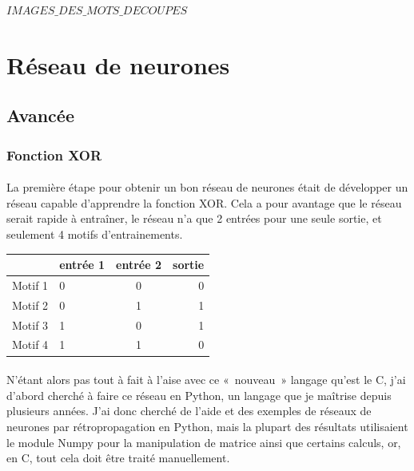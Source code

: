 \documentclass{article}
\begin{document}
	$IMAGES\_DES\_MOTS\_DECOUPES$
	
\newpage

\section{Réseau de neurones}

\subsection{Avancée}

\subsubsection{Fonction XOR}

\paragraph{} La première étape pour obtenir un bon réseau de neurones était de développer un réseau capable d'apprendre la fonction XOR. Cela a pour avantage que le réseau serait rapide à entraîner, le réseau n'a que 2 entrées pour une seule sortie, et seulement 4 motifs d'entrainements.

\begin{center}
\vspace*{0.2cm}
\begin{tabular}{|l|l|c|r|}
  \hline
  & entrée 1 & entrée 2 & sortie \\
  \hline
  Motif 1 & 0 & 0 & 0 \\
  Motif 2 & 0 & 1 & 1 \\
  Motif 3 & 1 & 0 & 1 \\
  Motif 4 & 1 & 1 & 0 \\
  \hline
\end{tabular}
\end{center}


\paragraph{}N'étant alors pas tout à fait à l'aise avec ce « nouveau » langage qu'est le C, j'ai d'abord cherché à faire ce réseau en Python, un langage que je maîtrise depuis plusieurs années. J'ai donc cherché de l'aide et des exemples de réseaux de neurones par rétropropagation en Python, mais la plupart des résultats utilisaient le module Numpy pour la manipulation de matrice ainsi que certains calculs, or, en C, tout cela doit être traité manuellement.
\end{document}
